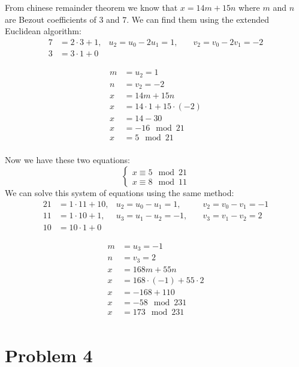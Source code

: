 \documentclass{article}
\begin{document}
From chinese remainder theorem we know that \(x = 14m + 15n\) where \(m\) and \(n\) are Bezout coefficients of \(3\) and \(7\).
We can find them using the extended Euclidean algorithm:
\begin{align*}
   7 &= 2 \cdot 3 + 1, & u_2 = u_0 - 2u_1 = 1, \quad & v_2 = v_0 - 2v_1 = -2 \\
   3 &= 3 \cdot 1 + 0
\end{align*}

\begin{align*}
   m &= u_2 = 1 \\
   n &= v_2 = -2 \\
   x &= 14m + 15n \\
   x &= 14 \cdot 1 + 15 \cdot (-2) \\
   x &= 14 - 30 \\
   x &= -16 \mod 21 \\
   x &= 5 \mod 21 \\
\end{align*}

Now we have these two equations:
\[
   \begin{cases}
      x \equiv 5 \mod 21 \\
      x \equiv 8 \mod 11
   \end{cases}
\]
We can solve this system of equations using the same method:
\begin{align*}
   21 &= 1 \cdot 11 + 10, & u_2 = u_0 - u_1 = 1, \quad & v_2 = v_0 - v_1 = -1 \\
   11 &= 1 \cdot 10 + 1, & u_3 = u_1 - u_2 = -1, \quad & v_3 = v_1 - v_2 = 2 \\
   10 &= 10 \cdot 1 + 0
\end{align*}

\begin{align*}
   m &= u_3 = -1 \\
   n &= v_3 = 2 \\
   x &= 168m + 55n \\
   x &= 168 \cdot (-1) + 55 \cdot 2 \\
   x &= -168 + 110 \\
   x &= -58 \mod 231 \\
   x &= 173 \mod 231 \\
\end{align*}

\section*{Problem 4}
\end{document}
